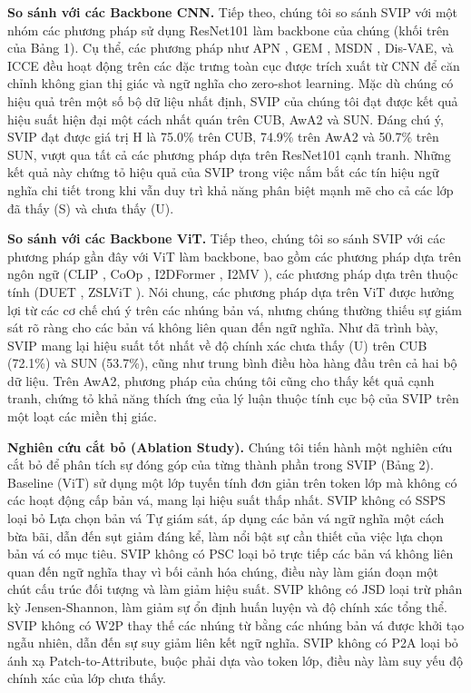 \textbf{So sánh với các Backbone CNN.} Tiếp theo, chúng tôi so sánh SVIP với một nhóm các phương pháp sử dụng ResNet101 làm backbone của chúng (khối trên của Bảng 1). Cụ thể, các phương pháp như APN \cite{61}, GEM \cite{33}, MSDN \cite{3}, Dis-VAE, và ICCE đều hoạt động trên các đặc trưng toàn cục được trích xuất từ CNN để căn chỉnh không gian thị giác và ngữ nghĩa cho zero-shot learning. Mặc dù chúng có hiệu quả trên một số bộ dữ liệu nhất định, SVIP của chúng tôi đạt được kết quả hiệu suất hiện đại một cách nhất quán trên CUB, AwA2 và SUN. Đáng chú ý, SVIP đạt được giá trị H là 75.0\% trên CUB, 74.9\% trên AwA2 và 50.7\% trên SUN, vượt qua tất cả các phương pháp dựa trên ResNet101 cạnh tranh. Những kết quả này chứng tỏ hiệu quả của SVIP trong việc nắm bắt các tín hiệu ngữ nghĩa chi tiết trong khi vẫn duy trì khả năng phân biệt mạnh mẽ cho cả các lớp đã thấy (S) và chưa thấy (U).

\textbf{So sánh với các Backbone ViT.} Tiếp theo, chúng tôi so sánh SVIP với các phương pháp gần đây với ViT làm backbone, bao gồm các phương pháp dựa trên ngôn ngữ (CLIP \cite{41}, CoOp \cite{72}, I2DFormer \cite{34}, I2MV \cite{35}), các phương pháp dựa trên thuộc tính (DUET \cite{13}, ZSLViT \cite{4}). Nói chung, các phương pháp dựa trên ViT được hưởng lợi từ các cơ chế chú ý trên các nhúng bản vá, nhưng chúng thường thiếu sự giám sát rõ ràng cho các bản vá không liên quan đến ngữ nghĩa. Như đã trình bày, SVIP mang lại hiệu suất tốt nhất về độ chính xác chưa thấy (U) trên CUB (72.1\%) và SUN (53.7\%), cũng như trung bình điều hòa hàng đầu trên cả hai bộ dữ liệu. Trên AwA2, phương pháp của chúng tôi cũng cho thấy kết quả cạnh tranh, chứng tỏ khả năng thích ứng của lý luận thuộc tính cục bộ của SVIP trên một loạt các miền thị giác.

\textbf{Nghiên cứu cắt bỏ (Ablation Study).} Chúng tôi tiến hành một nghiên cứu cắt bỏ để phân tích sự đóng góp của từng thành phần trong SVIP (Bảng 2). Baseline (ViT) sử dụng một lớp tuyến tính đơn giản trên token lớp mà không có các hoạt động cấp bản vá, mang lại hiệu suất thấp nhất. SVIP không có SSPS loại bỏ Lựa chọn bản vá Tự giám sát, áp dụng các bản vá ngữ nghĩa một cách bừa bãi, dẫn đến sụt giảm đáng kể, làm nổi bật sự cần thiết của việc lựa chọn bản vá có mục tiêu. SVIP không có PSC loại bỏ trực tiếp các bản vá không liên quan đến ngữ nghĩa thay vì bối cảnh hóa chúng, điều này làm gián đoạn một chút cấu trúc đối tượng và làm giảm hiệu suất. SVIP không có JSD loại trừ phân kỳ Jensen-Shannon, làm giảm sự ổn định huấn luyện và độ chính xác tổng thể. SVIP không có W2P thay thế các nhúng từ bằng các nhúng bản vá được khởi tạo ngẫu nhiên, dẫn đến sự suy giảm liên kết ngữ nghĩa. SVIP không có P2A loại bỏ ánh xạ Patch-to-Attribute, buộc phải dựa vào token lớp, điều này làm suy yếu độ chính xác của lớp chưa thấy.

